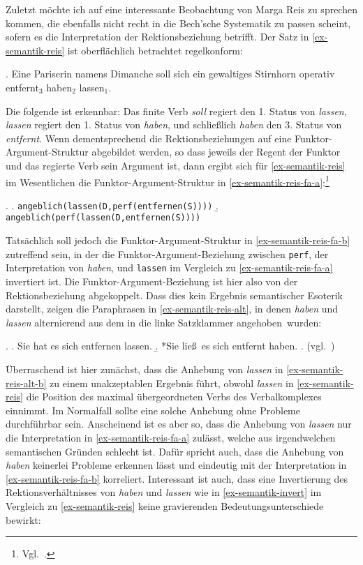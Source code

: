 Zuletzt möchte ich auf eine interessante Beobachtung von Marga Reis \citep{Reis:79} zu sprechen kommen, die ebenfalls nicht recht in die Bech'sche Systematik zu passen scheint, sofern es die Interpretation der Rektionsbeziehung betrifft. Der Satz in \ref{ex-semantik-reis} ist oberflächlich betrachtet regelkonform:
{
\ex. \label{ex-semantik-reis} Eine Pariserin namens Dimanche soll sich ein gewaltiges Stirnhorn operativ entfernt$_3$ haben$_2$ lassen$_1$. \hfill \citep[15]{Reis:79}

}
\noindent Die folgende  ist erkennbar: Das finite Verb {\it soll} regiert den 1. Status von {\it lassen}, {\it lassen} regiert den 1. Status von {\it haben}, und schlie\ss lich {\it haben} den 3. Status von {\it entfernt}. Wenn dementsprechend die Rektionsbeziehungen auf eine Funktor-Argument-Struktur abgebildet werden, so dass jeweils der Regent der Funktor und das regierte Verb sein Argument ist, dann ergibt sich für \ref{ex-semantik-reis} im Wesentlichen die Funktor-Argument-Struktur in \ref{ex-semantik-reis-fa-a}:\footnote{Vgl.\ \citet[(159)]{Meurers:99}.}

\ex. 
\a. {\tt angeblich(lassen(D,perf(entfernen(S))))} \label{ex-semantik-reis-fa-a}
\b. {\tt angeblich(perf(lassen(D,entfernen(S))))} \label{ex-semantik-reis-fa-b}   

Tatsächlich soll jedoch die Funktor-Argument-Struktur in \ref{ex-semantik-reis-fa-b} zutreffend sein, in der die Funktor-Argument-Beziehung zwischen {\tt perf}, der Interpretation von {\it haben}, und {\tt lassen} im Vergleich zu \ref{ex-semantik-reis-fa-a} invertiert ist. Die Funktor-Argument-Beziehung ist hier also von der Rektionsbeziehung abgekoppelt. Dass dies kein Ergebnis semantischer Esoterik darstellt, zeigen die Paraphrasen in \ref{ex-semantik-reis-alt}, in denen {\it haben} und {\it lassen} alternierend aus dem  in die linke Satzklammer \glqq angehoben\grqq\ wurden: 
  
\ex. \label{ex-semantik-reis-alt}
\a. Sie hat es sich entfernen lassen. \label{ex-semantik-reis-alt-a}
\b. *Sie lie\ss \ es sich entfernt haben. \label{ex-semantik-reis-alt-b}
\z. (vgl.\ \citealt[(160)]{Meurers:99})

Überraschend ist hier zunächst, dass die Anhebung von {\it lassen} in \ref{ex-semantik-reis-alt-b} zu einem unakzeptablen Ergebnis führt, obwohl {\it lassen} in \ref{ex-semantik-reis} die Position des maximal übergeordneten Verbs des Verbalkomplexes einnimmt. Im Normalfall sollte eine solche Anhebung ohne Probleme durchführbar sein. Anscheinend ist es aber so, dass die Anhebung von {\it lassen} nur die Interpretation in \ref{ex-semantik-reis-fa-a} zulässt, welche aus irgendwelchen semantischen Gründen schlecht ist. Dafür spricht auch, dass die Anhebung von {\it haben} keinerlei Probleme erkennen lässt und eindeutig mit der Interpretation in \ref{ex-semantik-reis-fa-b} korreliert. Interessant ist auch, dass eine Invertierung des Rektionsverhältnisses von {\it haben} und {\it lassen} wie in \ref{ex-semantik-invert} im Vergleich zu \ref{ex-semantik-reis} keine gravierenden Bedeutungsunterschiede bewirkt:\largerpage%

